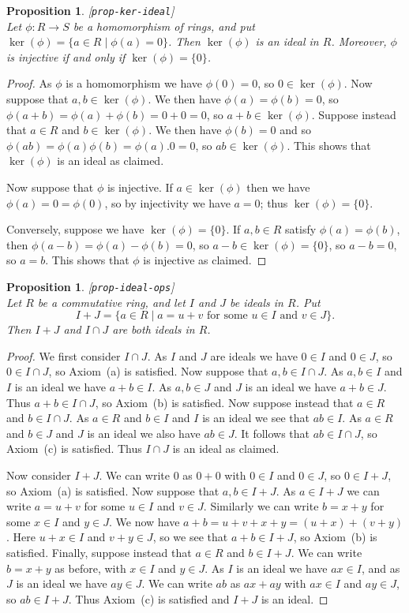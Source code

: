 \documentclass{amsart}
\newcommand{\lbl}[1]{\label{#1}\textup{[\texttt{#1}]}\ \\}
\newcommand{\lbl}{\label}
\newcommand{\st}        {\;|\;}
\renewcommand{\:}{\colon}
\newtheorem{proposition}[theorem]{Proposition}
\theoremstyle{definition}
\begin{document}
\begin{proposition}\lbl{prop-ker-ideal}
 Let $\phi\:R\to S$ be a homomorphism of rings, and put
 $\ker(\phi)=\{a\in R\st\phi(a)=0\}$.  Then $\ker(\phi)$ is an ideal
 in $R$.  Moreover, $\phi$ is injective if and only if
 $\ker(\phi)=\{0\}$.  
\end{proposition}
\begin{proof}
 As $\phi$ is a homomorphism we have $\phi(0)=0$, so $0\in\ker(\phi)$.
 Now suppose that $a,b\in\ker(\phi)$.  We then have
 $\phi(a)=\phi(b)=0$, so $\phi(a+b)=\phi(a)+\phi(b)=0+0=0$, so
 $a+b\in\ker(\phi)$.  Suppose instead that $a\in R$ and
 $b\in\ker(\phi)$.  We then have $\phi(b)=0$ and so
 $\phi(ab)=\phi(a)\phi(b)=\phi(a).0=0$, so $ab\in\ker(\phi)$.  This
 shows that $\ker(\phi)$ is an ideal as claimed.

 Now suppose that $\phi$ is injective.  If $a\in\ker(\phi)$ then we
 have $\phi(a)=0=\phi(0)$, so by injectivity we have $a=0$; thus
 $\ker(\phi)=\{0\}$.  

 Conversely, suppose we have $\ker(\phi)=\{0\}$.  If $a,b\in R$
 satisfy $\phi(a)=\phi(b)$, then $\phi(a-b)=\phi(a)-\phi(b)=0$, so
 $a-b\in\ker(\phi)=\{0\}$, so $a-b=0$, so $a=b$.  This shows that
 $\phi$ is injective as claimed. 
\end{proof}

\begin{proposition}\lbl{prop-ideal-ops}
 Let $R$ be a commutative ring, and let $I$ and $J$ be ideals in $R$.
 Put 
 \[ I+J = \{a\in R\st a=u+v \text{ for some } 
             u\in I \text{ and } v\in J\}.
 \]
 Then $I+J$ and $I\cap J$ are both ideals in $R$.
\end{proposition}
\begin{proof}
 We first consider $I\cap J$.  As $I$ and $J$ are ideals we have
 $0\in I$ and $0\in J$, so $0\in I\cap J$, so Axiom~(a) is satisfied.
 Now suppose that $a,b\in I\cap J$.  As $a,b\in I$ and $I$ is an ideal
 we have $a+b\in I$.  As $a,b\in J$ and $J$ is an ideal we have
 $a+b\in J$.  Thus $a+b\in I\cap J$, so Axiom~(b) is satisfied.  Now
 suppose instead that $a\in R$ and $b\in I\cap J$.  As $a\in R$ and
 $b\in I$ and $I$ is an ideal we see that $ab\in I$.  As $a\in R$ and
 $b\in J$  and $J$ is an ideal we also have $ab\in J$.  It follows
 that $ab\in I\cap J$, so Axiom~(c) is satisfied.  Thus $I\cap J$ is
 an ideal as claimed.

 Now consider $I+J$.  We can write $0$ as $0+0$ with $0\in I$ and
 $0\in J$, so $0\in I+J$, so Axiom~(a) is satisfied.  Now suppose that
 $a,b\in I+J$.  As $a\in I+J$ we can write $a=u+v$ for some $u\in I$
 and $v\in J$.  Similarly we can write $b=x+y$ for some $x\in I$ and
 $y\in J$.  We now have $a+b=u+v+x+y=(u+x)+(v+y)$.  Here $u+x\in I$
 and $v+y\in J$, so we see that $a+b\in I+J$, so Axiom~(b) is
 satisfied.  Finally, suppose instead that $a\in R$ and $b\in I+J$.
 We can write $b=x+y$ as before, with $x\in I$ and $y\in J$.  As $I$
 is an ideal we have $ax\in I$, and as $J$ is an ideal we have
 $ay\in J$.  We can write $ab$ as $ax+ay$ with $ax\in I$ and
 $ay\in J$, so $ab\in I+J$.  Thus Axiom~(c) is satisfied and $I+J$ is
 an ideal.
\end{proof}
\end{document}
